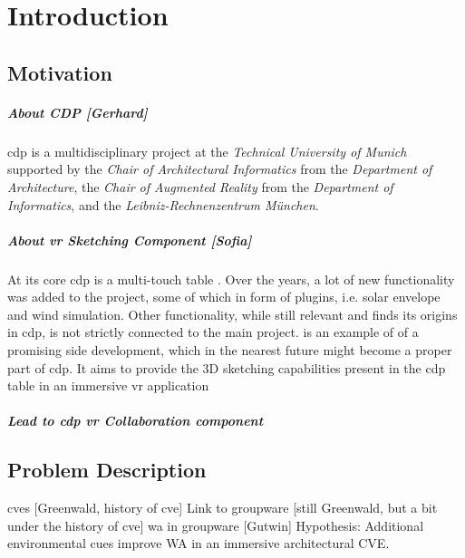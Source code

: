 



\chapter{Introduction}

\section{Motivation}
\paragraph{About CDP [Gerhard]} \gls{cdp} is a multidisciplinary project at the \textit{Technical University of Munich} supported by the \textit{Chair of Architectural Informatics} from the \textit{Department of Architecture}, the \textit{Chair of Augmented Reality} from the \textit{Department of Informatics}, and the \textit{Leibniz-Rechnenzentrum M{\"u}nchen}.

\paragraph{About \gls{vr} Sketching Component [Sofia]} At its core \gls{cdp} is a multi-touch table \cite[p.~5]{lampe_cdp//vr-sketching_2017}. Over the years, a lot of new functionality was added to the project, some of which in form of plugins, i.e. solar envelope and wind simulation. Other functionality, while still relevant and finds its origins in \gls{cdp}, is not strictly connected to the main project. \cite{lampe_cdp//vr-sketching_2017} is an example of of a promising side development, which in the nearest future might become a proper part of \gls{cdp}. It aims to provide the 3D sketching capabilities present in the \gls{cdp} table in an immersive \gls{vr} application

\paragraph{Lead to \gls{cdp} \gls{vr} Collaboration component} 

\section{Problem Description}
\gls{cve}s [Greenwald, history of \gls{cve}]
Link to groupware [still Greenwald, but a bit under the history of \gls{cve}]
\gls{wa} in groupware [Gutwin]
Hypothesis: Additional environmental cues improve WA in an immersive architectural CVE.
